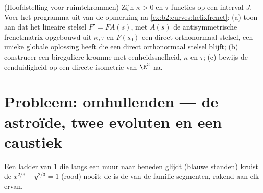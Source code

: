 \begin{exercise}[$\star\star\star$]\label{exo:b2:curves:12}
(Hoofdstelling voor ruimtekrommen) Zijn $\kappa > 0$ en $\tau$
 functies op een interval $J$. Voer het programma uit van
de opmerking na \cref{ex:b2:curves:helixfrenet}: (a) toon aan dat
het lineaire stelsel $F' = FA(s)$, met $A(s)$ de antisymmetrische
frenetmatrix opgebouwd uit $\kappa, \tau$ en $F(s_0)$ een direct
orthonormaal stelsel, een unieke globale oplossing heeft die een
direct orthonormaal stelsel blijft; (b) construeer een bireguliere
kromme met eenheidssnelheid,  $\kappa$ en  $\tau$;
(c) bewijs de eenduidigheid op een directe isometrie van $\R^3$ na.
\end{exercise}

\section{Probleem: omhullenden --- de astroïde, twee evoluten en
een caustiek}

\begin{omfigure}

{\small Een ladder van  $1$ die langs een muur naar beneden
glijdt (blauwe standen) kruist de  $x^{2/3} + y^{2/3} = 1$
(rood) nooit: de  is de \emph{} van de familie
segmenten, rakend aan elk ervan.}
\end{omfigure}

